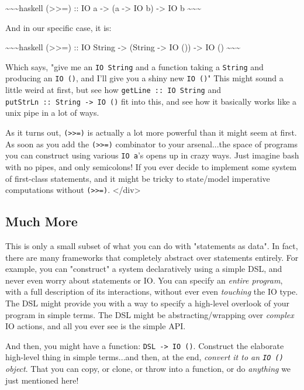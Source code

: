 \documentclass[]{article}
\begin{document}
\textasciitilde{}\textasciitilde{}\textasciitilde{}haskell
(\textgreater{}\textgreater{}=) :: IO a -\textgreater{} (a -\textgreater{} IO b)
-\textgreater{} IO b \textasciitilde{}\textasciitilde{}\textasciitilde{}

And in our specific case, it is:

\textasciitilde{}\textasciitilde{}\textasciitilde{}haskell
(\textgreater{}\textgreater{}=) :: IO String -\textgreater{} (String
-\textgreater{} IO ()) -\textgreater{} IO ()
\textasciitilde{}\textasciitilde{}\textasciitilde{}

Which says, "give me an \texttt{IO\ String} and a function taking a
\texttt{String} and producing an \texttt{IO\ ()}, and I'll give you a shiny new
\texttt{IO\ ()}" This might sound a little weird at first, but see how
\texttt{getLine\ ::\ IO\ String} and
\texttt{putStrLn\ ::\ String\ -\textgreater{}\ IO\ ()} fit into this, and see
how it basically works like a unix pipe in a lot of ways.

As it turns out, \texttt{(\textgreater{}\textgreater{}=)} is actually a lot more
powerful than it might seem at first. As soon as you add the
\texttt{(\textgreater{}\textgreater{}=)} combinator to your arsenal...the space
of programs you can construct using various \texttt{IO\ a}'s opens up in crazy
ways. Just imagine bash with no pipes, and only semicolons! If you ever decide
to implement some system of first-class statements, and it might be tricky to
state/model imperative computations without
\texttt{(\textgreater{}\textgreater{}=)}. \textless{}/div\textgreater{}

\subsection{Much More}

This is only a small subset of what you can do with "statements as data". In
fact, there are many frameworks that completely abstract over statements
entirely. For example, you can "construct" a system declaratively using a simple
DSL, and never even worry about statements or IO. You can specify an
\emph{entire program}, with a full description of its interactions, without ever
even \emph{touching} the IO type. The DSL might provide you with a way to
specify a high-level overlook of your program in simple terms. The DSL might be
abstracting/wrapping over \emph{complex} IO actions, and all you ever see is the
simple API.

And then, you might have a function: \texttt{DSL\ -\textgreater{}\ IO\ ()}.
Construct the elaborate high-level thing in simple terms...and then, at the end,
\emph{convert it to an \texttt{IO\ ()} object}. That you can copy, or clone, or
throw into a function, or do \emph{anything} we just mentioned here!
\end{document}
